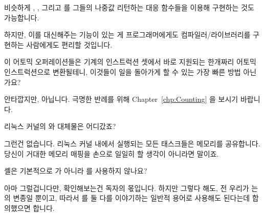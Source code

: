 \begin{enumerate}
	비슷하게 , ,
	그리고  를 그들의 나중값 리턴하는 대응
	함수들을 이용해 구현하는 것도 가능합니다.

	하지만, 이를 대신해주는 기능이 있는 게 프로그래머에게도
	컴파일러/라이브러리를 구현하는 사람에게도 편리할 것입니다.

\QuickQ{}
	이 어토믹 오퍼레이션들은 기계의 인스트럭션 셋에서 바로 지원되는
	한개짜리 어토믹 인스트럭션으로 변환될테니, 이것들이 일을 돌아가게 할 수
	있는 가장 빠른 방법 아닌가요?

\QuickA{}
	안타깝지만, 아닙니다.
	극명한 반례를 위해 Chapter~\ref{chp:Counting} 을 보시기 바랍니다.

\QuickQ{}
	리눅스 커널의  와  대체물은 어디갔죠?

\QuickA{}
	그런건 없습니다.
	리눅스 커널 내에서 실행되는 모든 태스크들은 메모리를 공유합니다. 당신이
	거대한 메모리 매핑을 손으로 일일히 할 생각이 아니라면 말이죠.

\QuickQ{}
	셸은 기본적으로  가 아니라  를 사용하지 않나요?

\QuickA{}
	아마 그럴겁니다만, 확인해보는건 독자의 몫입니다.
	하지만 그렇다 해도, 전 우리가  는  의 변종일
	뿐이고, 따라서  를 둘 다를 이야기하는 일반적 용어로 사용해도
	된다는데 합의했으면 합니다.

\end{enumerate}
